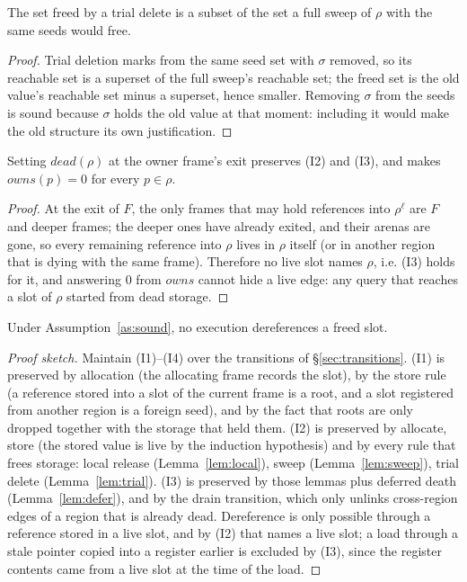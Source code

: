 \begin{lemma}
\label{lem:trial}
The set freed by a trial delete is a subset of the set a full sweep of $\rho$ with the same seeds
would free.
\end{lemma}
\begin{proof}
Trial deletion marks from the same seed set with $\sigma$ removed, so its reachable set is a superset
of the full sweep's reachable set; the freed set is the old value's reachable set minus a superset,
hence smaller. Removing $\sigma$ from the seeds is sound because $\sigma$ holds the old value at that
moment: including it would make the old structure its own justification.
\end{proof}

\begin{lemma}
\label{lem:defer}
Setting $\mathit{dead}(\rho)$ at the owner frame's exit preserves (I2) and (I3), and makes
$\mathit{owns}(p) = 0$ for every $p \in \rho$.
\end{lemma}
\begin{proof}
At the exit of $F$, the only frames that may hold references into $\rho^{\ell}$ are $F$ and deeper
frames; the deeper ones have already exited, and their arenas are gone, so every remaining reference
into $\rho$ lives in $\rho$ itself (or in another region that is dying with the same frame).
Therefore no live slot names $\rho$, i.e. (I3) holds for it, and answering $0$ from
$\mathit{owns}$ cannot hide a live edge: any query that reaches a slot of $\rho$ started from dead
storage.
\end{proof}

\begin{theorem}
\label{thm:safe}
Under Assumption~\ref{as:sound}, no execution dereferences a freed slot.
\end{theorem}
\begin{proof}[Proof sketch]
Maintain (I1)--(I4) over the transitions of \S\ref{sec:transitions}.
(I1) is preserved by allocation (the allocating frame records the slot), by the store rule (a
reference stored into a slot of the current frame is a root, and a slot registered from another
region is a foreign seed), and by the fact that roots are only dropped together with the storage that
held them.
(I2) is preserved by allocate, store (the stored value is live by the induction hypothesis) and by
every rule that frees storage: local release (Lemma~\ref{lem:local}), sweep
(Lemma~\ref{lem:sweep}), trial delete (Lemma~\ref{lem:trial}).
(I3) is preserved by those lemmas plus deferred death (Lemma~\ref{lem:defer}), and by the drain
transition, which only unlinks cross-region edges of a region that is already dead.
Dereference is only possible through a reference stored in a live slot, and by (I2) that names a live
slot; a load through a stale pointer copied into a register earlier is excluded by (I3), since the
register contents came from a live slot at the time of the load.
\end{proof}

